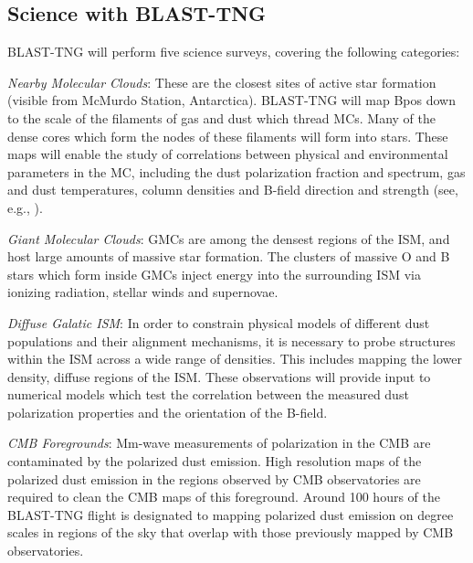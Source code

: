 \subsection{Science with BLAST-TNG}

BLAST-TNG will perform five science surveys, covering the following categories:

\vspace{5mm}

\textit{Nearby Molecular Clouds}: These are the closest sites of active star formation (visible from McMurdo Station, Antarctica). BLAST-TNG will map \gls{Bpos} down to the scale of the filaments of gas and dust which thread MCs. Many of the dense cores which form the nodes of these filaments will form into stars. These maps will enable the study of correlations between physical and environmental parameters in the MC, including the dust polarization fraction and spectrum, gas and dust temperatures, column densities and B-field direction and strength (see, e.g., \citet{galitzki2014balloon,fissel2016balloon,fissel2018relative,shariff2019submillimeter,gandilo2016submillimeter}).

\vspace{5mm}

\textit{Giant Molecular Clouds}: GMCs are among the densest regions of the ISM, and host large amounts of massive star formation. The clusters of massive O and B stars which form inside GMCs inject energy into the surrounding ISM via ionizing radiation, stellar winds and supernovae.
\vspace{5mm}

\textit{Diffuse Galatic ISM}: In order to constrain physical models of different dust populations and their alignment mechanisms, it is necessary to probe structures within the ISM across a wide range of densities. This includes mapping the lower density, diffuse regions of the ISM. These observations will provide input to numerical models which test the correlation between the measured dust polarization properties and the orientation of the B-field.

\vspace{5mm}

\textit{CMB Foregrounds}: Mm-wave measurements of polarization in the CMB are contaminated by the polarized dust emission. High resolution maps of the polarized dust emission in the regions observed by CMB observatories are required to clean the CMB maps of this foreground. Around 100 hours of the BLAST-TNG flight is designated to mapping polarized dust emission on degree scales in regions of the sky that overlap with those previously mapped by CMB observatories.

